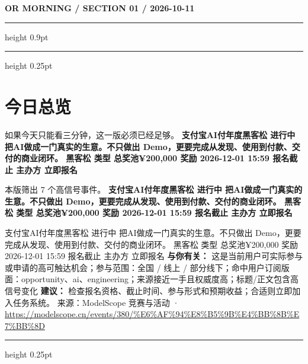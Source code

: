 \documentclass[10.5pt]{ctexart}
\begin{document}
{\small\bfseries OR MORNING / SECTION 01 / 2026-10-11}
\vspace{2mm}
\hrule height 0.9pt
\vspace{1.5mm}
\hrule height 0.25pt
\vspace{4mm}
\section*{今日总览}
{\color{ormuted} 如果今天只能看三分钟，这一版必须已经足够。}
\vspace{2mm}
{\fontsize{25}{29}\selectfont\bfseries 支付宝AI付年度黑客松 进行中 把AI做成一门真实的生意。不只做出 Demo，更要完成从发现、使用到付款、交付的商业闭环。 黑客松 类型 总奖池¥200,000 奖励 2026-12-01 15:59 报名截止 主办方 立即报名}\par
\vspace{2mm}
{\large 本版筛出 7 个高信号事件。}
\vspace{3mm}
{\Large\bfseries 支付宝AI付年度黑客松 进行中 把AI做成一门真实的生意。不只做出 Demo，更要完成从发现、使用到付款、交付的商业闭环。 黑客松 类型 总奖池¥200,000 奖励 2026-12-01 15:59 报名截止 主办方 立即报名}\par
支付宝AI付年度黑客松 进行中 把AI做成一门真实的生意。不只做出 Demo，更要完成从发现、使用到付款、交付的商业闭环。 黑客松 类型 总奖池¥200,000 奖励 2026-12-01 15:59 报名截止 主办方 立即报名
\textbf{与你有关：} 这是当前用户可实际参与或申请的高可触达机会；参与范围：全国 / 线上 / 部分线下；命中用户订阅版面：opportunity、ai、engineering；来源接近一手且权威度高；标题/正文包含高信号变化
\textbf{建议：} 检查报名资格、截止时间、参与形式和预期收益；合适则立即加入任务系统。
{\footnotesize\color{ormuted} 来源：ModelScope 竞赛与活动 · \url{https://modelscope.cn/events/380/%E6%AF%94%E8%B5%9B%E4%BB%8B%E7%BB%8D}}
\vspace{3mm}
\hrule height 0.25pt
\vspace{3mm}
\end{document}
